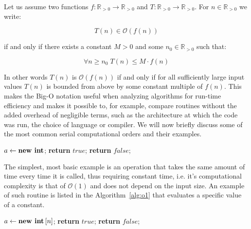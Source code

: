 \begin{definition}
Let us assume two functions $f:\mathbb{R}_{>0}\rightarrow\mathbb{R}_{>0}$ and $T:\mathbb{R}_{>0}\rightarrow\mathbb{R}_{>0}$. 
For $n \in \mathbb{R}_{>0}$ we write:

\begin{equation}
T(n) \in \mathcal{O}\left(f(n)\right)
\label{eq:bigOh}
\end{equation}

\noindent
if and only if there exists a constant $M>0$ and some $n_0 \in \mathbb{R}_{>0}$ such that:

\begin{equation}
\forall n\geq n_{0}\;T(n)\leq M \cdot f(n)
\end{equation}
\end{definition}


In other words $T(n)$ is $\mathcal{O}\left(f(n)\right)$ if and only if for all sufficiently large input values $T(n)$ is bounded from above by some constant multiple of $f(n)$.
This makes the Big-O notation useful when analyzing algorithms for run-time efficiency and makes it possible to, for example, compare routines without the added overhead of negligible terms, such as the architecture at which the code was run, the choice of language or compiler.
We will now briefly discuss some of the most common serial computational orders and their examples. 

\begin{algorithm}[H]
\centering
\begin{algorithmic}[1]
\State $a \gets \text{\textbf{new int}}$;
%
%
\State \textbf{return} $true$;
%
\Else 
%
\State \textbf{return} $false$;
%
\EndIf
\end{algorithmic}
\caption{
{ \footnotesize 
{\bf Single test operation.} 
} %
}
\label{alg:o1}
\end{algorithm}

The simplest, most basic example is an operation that takes the same amount of time every time it is called, thus requiring constant time, i.e. it's computational complexity is that of $\mathcal{O}\left(1\right)$ and does not depend on the input size.
An example of such routine is listed in the Algorithm~\ref{alg:o1} that evaluates a specific value of a constant.

\begin{algorithm}[H]
\centering
\begin{algorithmic}[1]
\State $a \gets \text{\textbf{new int}}\left[n\right]$;
%
%
%
\State \textbf{return} $true$;
%
\Else 
%
\State \textbf{return} $false$;
%
\EndIf
%
\EndFor
\end{algorithmic}
\caption{
{ \footnotesize 
{\bf Search for a value.} 
}%
}
\label{alg:on}
\end{algorithm}

